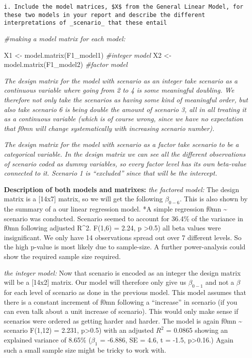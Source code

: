 \documentclass[
]{article}
\newenvironment{Shaded}{\begin{snugshade}}{\end{snugshade}}
\newcommand{\CommentTok}[1]{\textcolor[rgb]{0.56,0.35,0.01}{\textit{#1}}}
\newcommand{\FunctionTok}[1]{\textcolor[rgb]{0.00,0.00,0.00}{#1}}
\newcommand{\NormalTok}[1]{#1}
\newcommand{\OtherTok}[1]{\textcolor[rgb]{0.56,0.35,0.01}{#1}}
\begin{document}
\begin{verbatim}
i. Include the model matrices, $X$ from the General Linear Model, for these two models in your report and describe the different interpretations of _scenario_ that these entail
\end{verbatim}

\begin{Shaded}
\begin{Highlighting}[]
\CommentTok{\#making a model matrix for each model:}

\NormalTok{X1 }\OtherTok{\textless{}{-}} \FunctionTok{model.matrix}\NormalTok{(F1\_model1) }\CommentTok{\#integer model}
\NormalTok{X2 }\OtherTok{\textless{}{-}} \FunctionTok{model.matrix}\NormalTok{(F1\_model2) }\CommentTok{\#factor model}
\end{Highlighting}
\end{Shaded}

\emph{The design matrix for the model with scenario as an integer take
scenario as a continuous variable where going from 2 to 4 is some
meaningful doubling. We therefore not only take the scenarios as having
some kind of meaningful order, but also take scenario 6 is being double
the amount of scenario 3, all in all treating it as a continuous
variable (which is of course wrong, since we have no expectation that
f0mn will change systematically with increasing scenario number).}

\emph{The design matrix for the model with scenario as a factor take
scenario to be a categorical variable. In the design matrix we can see
all the different observations of scenario coded as dummy variables, so
every factor level has its own beta-value connected to it. Scenario 1 is
``excluded'' since that will be the intercept.}

\textbf{Description of both models and matrixes:} \emph{the factored
model:} The design matrix is a {[}14x7{]} matrix, so we will get the
following \(\beta_{0-6}\). This is also shown by the summary of a our
linear regression model. *A simple regression f0mn \textasciitilde{}
scenario was conducted. Scenario seemed to account for 36.4\% of the
variance in f0mn following adjusted R\^{}2. F(1,6) = 2.24, p
\textgreater0.5) all beta values were insignificant. We only have 14
observations spread out over 7 different levels. So the high p-value is
most likely due to sample-size. A further power-analysis could show the
required sample size required.

\emph{the integer model:} Now that scenario is encoded as an integer the
design matrix will be a {[}14x2{]} matrix. Our model will therefore only
give us \(\beta_{0-1}\) and not a \(\beta\) for each level of scenario
as done in the previous model. This model assumes that there is a
constant increment of f0mn following a ``increase'' in scenario (if you
can even talk about a unit increase of scenario). This would only make
sense if scenarios were ordered as getting harder and harder. The model
is again f0mn \textasciitilde{} scenario F(1,12) = 2.231,
p\textgreater0.5) with an adjusted \(R^2\) = 0.0865 showing an explained
variance of 8.65\% (\(\beta_1\) = -6.886, SE = 4.6, t = -1.5,
p\textgreater0.16.) Again such a small sample size might be tricky to
work with.
\end{document}
